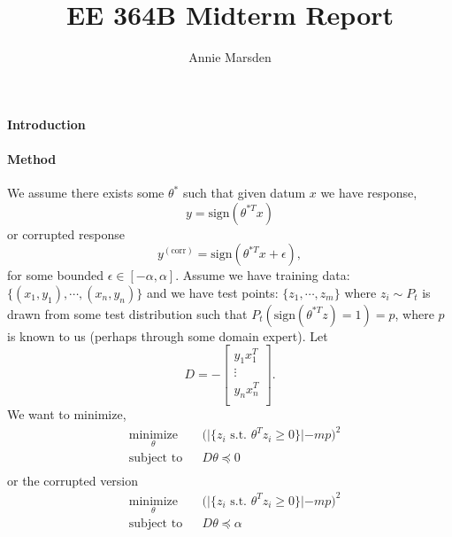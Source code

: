 \documentclass[12pt]{article}
\title{EE 364B Midterm Report}
\author{Annie Marsden}
\begin{document}
\paragraph{Introduction}

\paragraph{Method}
We assume there exists some $\theta^{*}$ such that given datum $x$ we have response,
\begin{equation*}
y = \textrm{sign}(\theta^{*T}x)
\end{equation*}
or corrupted response
\begin{equation*}
y^{(\textrm{corr})} = \textrm{sign}(\theta^{*T}x + \epsilon),
\end{equation*}
for some bounded $\epsilon \in [-\alpha, \alpha]$. Assume we have training data: $ \{ (x_{1}, y_{1}), \cdots, (x_n, y_n) \} $ and we have test points: $\{ z_{1}, \cdots, z_{m} \}$ where $z_{i} \sim P_{t}$ is drawn from some test distribution such that $P_{t}(\textrm{sign}(\theta^{*T}z) = 1) = p$, where $p$ is known to us (perhaps through some domain expert). Let 
\begin{equation*}
D = -  \begin{bmatrix}
       y_{1}x_{1}^{T}  \\
    \vdots \\
    y_{n}x_{n}^{T} \\
\end{bmatrix}.
\end{equation*}
 We want to minimize, 
\begin{equation}
\label{original} 
\begin{aligned}
& \underset{\theta}{\text{minimize}}
& & \big( \lvert \{ z_{i} \textrm{ s.t. } \theta^{T}z_{i} \geq 0 \} \lvert - mp \big)^{2} \\
& \text{subject to}
& & D\theta \preceq 0 \\
\end{aligned}
\end{equation}
or the corrupted version 
\begin{equation}
\begin{aligned}
& \underset{\theta}{\text{minimize}}
& & \big( \lvert \{ z_{i} \textrm{ s.t. } \theta^{T}z_{i} \geq 0 \} \lvert - mp \big)^{2} \\
& \text{subject to}
& & D\theta \preceq \alpha \\
\end{aligned}
\end{equation}
\end{document}
